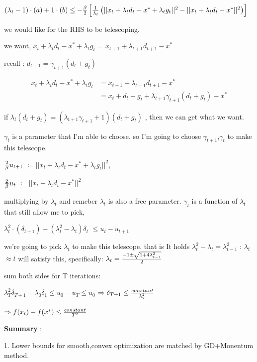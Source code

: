 \documentclass[twoside]{article}
\begin{document}
\begin{center}

$(\lambda_t - 1)\cdot(a) + 1\cdot(b) \leq -{\beta \over 2}\left[{1 \over \lambda_t}\left(||x_t+\lambda_t d_t-x^*+\lambda_t g_t||^2-||x_t+\lambda_t d_t - x^*||^2\right)\right]$

we would like for the RHS to be telescoping. 

we want, $x_t+\lambda_t d_t - x^*+\lambda_t g_t$ = $x_{t+1}+\lambda_{t+1}d_{t+1}-x^*$

recall : $d_{t+1} = \gamma_{t+1}(d_t+g_t)$

\begin{align*}
x_t+\lambda_t d_t - x^*+\lambda_t g_t &= x_{t+1}+\lambda_{t+1}d_{t+1}-x^*\\
&=x_t+d_t+g_t+\lambda_{t+1}\gamma_{t+1}(d_t+g_t)-x^*
\end{align*}

if $\lambda_t(d_t+g_t) = (\lambda_{t+1}\gamma_{t+1}+1)(d_t+g_t)$ , then we can get what we want.

$\gamma_t$ is a parameter that I'm able to choose. so I'm going to choose $\gamma_{t+1}$,$\gamma_t$ to make this telescope.

${2 \over \beta}u_{t+1}$ $\coloneqq ||x_t+\lambda_t d_t-x^*+\lambda_t g_t||^2$, 

${2 \over \beta}u_t$ $\coloneqq ||x_t+\lambda_t d_t - x^*||^2$

multiplying by $\lambda_t$ and remeber $\lambda_t$ is also a free parameter. $\gamma_t$ is a function of $\lambda_t$ that still allow me to pick,

$\lambda_t^2\cdot(\delta_{t+1}) - (\lambda_t^2-\lambda_t)\delta_t$ $\leq u_t - u_{t+1}$

we're going to pick $\lambda_t$ to make this telescope. that is It holds $\lambda_t^2 - \lambda_t=\lambda_{t-1}^2$ : $\lambda_t$ $\approx t$ will satisfy this, specifically: $\lambda_t = {-1\pm\sqrt{1+4\lambda_{t-1}^2} \over 2}$ 

sum both sides for T iterations:

$\lambda_T^2\delta_{T+1}-\lambda_0 \delta_1 \leq u_0 - u_T \leq u_0$ 
 $\Rightarrow{\delta_{T+1}\leq {constant \over \lambda_T^2}}$

 $\Rightarrow f(x_t)-f(x^*) \leq {constant\over T^2}$
\end{center}

\textbf{Summary} : 

1. Lower bounds for smooth,convex optimization are matched by GD+Monentum method.
\end{document}

